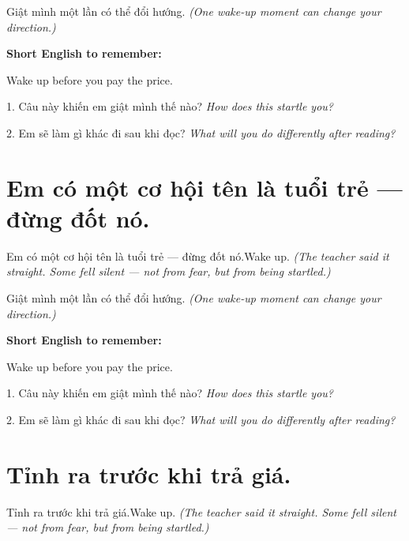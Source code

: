 \begin{baihoc}
Giật mình một lần có thể đổi hướng.
\textit{(One wake-up moment can change your direction.)}
\end{baihoc}

\begin{ghinhoanh}
\textbf{Short English to remember:}

Wake up before you pay the price.

\end{ghinhoanh}

\begin{tuhocnhanh}
1. Câu này khiến em giật mình thế nào? \textit{How does this startle you?}

2. Em sẽ làm gì khác đi sau khi đọc? \textit{What will you do differently after reading?}
\end{tuhocnhanh}
\ngancach


\section{Em có một cơ hội tên là tuổi trẻ — đừng đốt nó.}
\begin{truyen}{Em có một cơ hội tên là tuổi trẻ — đừng đốt nó.}{Wake up.}
\textit{(The teacher said it straight. Some fell silent — not from fear, but from being startled.)}
\end{truyen}

\begin{baihoc}
Giật mình một lần có thể đổi hướng.
\textit{(One wake-up moment can change your direction.)}
\end{baihoc}

\begin{ghinhoanh}
\textbf{Short English to remember:}

Wake up before you pay the price.

\end{ghinhoanh}

\begin{tuhocnhanh}
1. Câu này khiến em giật mình thế nào? \textit{How does this startle you?}

2. Em sẽ làm gì khác đi sau khi đọc? \textit{What will you do differently after reading?}
\end{tuhocnhanh}
\ngancach


\section{Tỉnh ra trước khi trả giá.}
\begin{truyen}{Tỉnh ra trước khi trả giá.}{Wake up.}
\textit{(The teacher said it straight. Some fell silent — not from fear, but from being startled.)}
\end{truyen}

